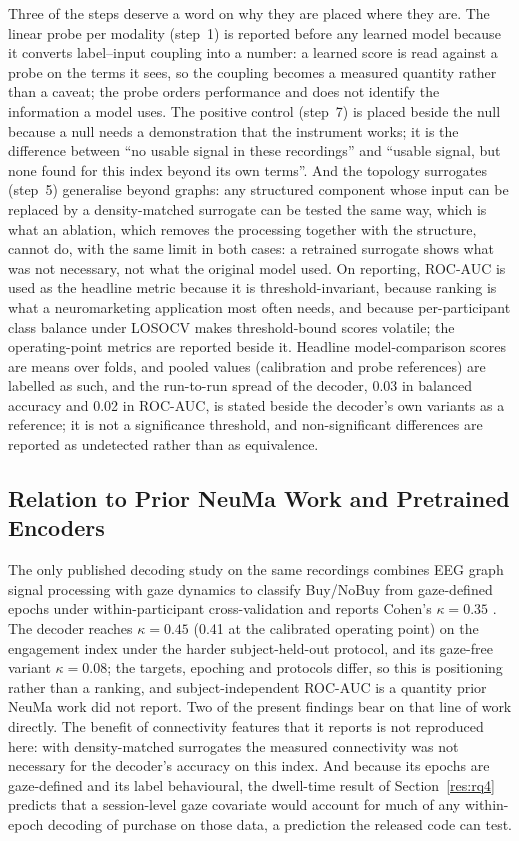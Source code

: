 \documentclass[pdflatex,sn-basic,Numbered,twocolumn,iicol]{sn-jnl}
\theoremstyle{thmstyleone}%
\theoremstyle{thmstyletwo}%
\theoremstyle{thmstylethree}%
\begin{document}
Three of the steps deserve a word on why they are placed where they are. The linear probe per modality (step~1) is reported before any learned model because it converts label--input coupling into a number: a learned score is read against a probe on the terms it sees, so the coupling becomes a measured quantity rather than a caveat; the probe orders performance and does not identify the information a model uses. The positive control (step~7) is placed beside the null because a null needs a demonstration that the instrument works; it is the difference between ``no usable signal in these recordings'' and ``usable signal, but none found for this index beyond its own terms''. And the topology surrogates (step~5) generalise beyond graphs: any structured component whose input can be replaced by a density-matched surrogate can be tested the same way, which is what an ablation, which removes the processing together with the structure, cannot do, with the same limit in both cases: a retrained surrogate shows what was not necessary, not what the original model used. On reporting, ROC-AUC is used as the headline metric because it is threshold-invariant, because ranking is what a neuromarketing application most often needs, and because per-participant class balance under LOSOCV makes threshold-bound scores volatile; the operating-point metrics are reported beside it. Headline model-comparison scores are means over folds, and pooled values (calibration and probe references) are labelled as such, and the run-to-run spread of the decoder, 0.03 in balanced accuracy and 0.02 in ROC-AUC, is stated beside the decoder's own variants as a reference; it is not a significance threshold, and non-significant differences are reported as undetected rather than as equivalence.

\subsection{Relation to Prior NeuMa Work and Pretrained Encoders}\label{disc:prior}

The only published decoding study on the same recordings combines EEG graph signal processing with gaze dynamics to classify Buy/NoBuy from gaze-defined epochs under within-participant cross-validation and reports Cohen's $\kappa=0.35$ \cite{ref18}. The decoder reaches $\kappa=0.45$ (0.41 at the calibrated operating point) on the engagement index under the harder subject-held-out protocol, and its gaze-free variant $\kappa=0.08$; the targets, epoching and protocols differ, so this is positioning rather than a ranking, and subject-independent ROC-AUC is a quantity prior NeuMa work did not report. Two of the present findings bear on that line of work directly. The benefit of connectivity features that it reports is not reproduced here: with density-matched surrogates the measured connectivity was not necessary for the decoder's accuracy on this index. And because its epochs are gaze-defined and its label behavioural, the dwell-time result of Section~\ref{res:rq4} predicts that a session-level gaze covariate would account for much of any within-epoch decoding of purchase on those data, a prediction the released code can test.
\end{document}

